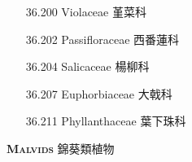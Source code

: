 \begin{enumerate}
\begin{enumerate}
        
      \item[36.200] Violaceae 堇菜科  
        
      \item[36.202] Passifloraceae 西番蓮科  
        
      \item[36.204] Salicaceae 楊柳科  
        
      \item[36.207] Euphorbiaceae 大戟科  
        
      \item[36.211] Phyllanthaceae 葉下珠科  
        
    \end{enumerate}
\end{enumerate}
\vspace{2ex} 
\noindent \normalsize\textsc{\textbf{Malvids} 錦葵類植物}\selectfont \\
\footnotesize\selectfont
